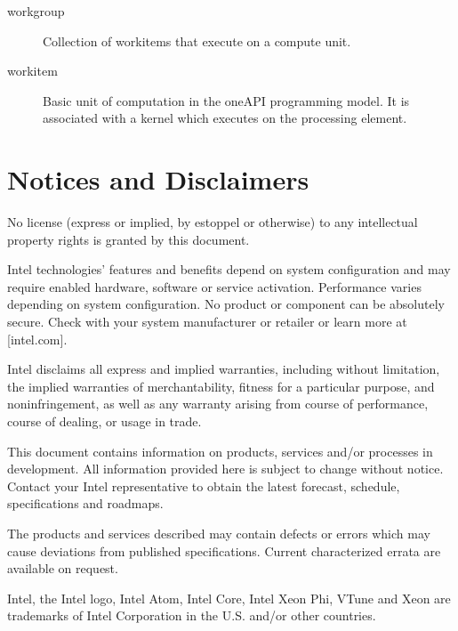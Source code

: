 \documentclass[letterpaper,10pt,english]{sphinxmanual}
\begin{document}
\begin{description}
\item[{work\sphinxhyphen{}group\label{\detokenize{glossary:term-work-group}}}] \leavevmode
Collection of work\sphinxhyphen{}items that execute on a compute unit.

\item[{work\sphinxhyphen{}item\label{\detokenize{glossary:term-work-item}}}] \leavevmode
Basic unit of computation in the oneAPI programming model. It is
associated with a kernel which executes on the processing element.

\end{description}


\chapter{Notices and Disclaimers}
\label{\detokenize{notices-and-disclaimers:notices-and-disclaimers}}\label{\detokenize{notices-and-disclaimers:id1}}\label{\detokenize{notices-and-disclaimers::doc}}
No license (express or implied, by estoppel or otherwise) to any
intellectual property rights is granted by this document.

Intel technologies’ features and benefits depend on system
configuration and may require enabled hardware, software or service
activation. Performance varies depending on system configuration. No
product or component can be absolutely secure. Check with your system
manufacturer or retailer or learn more at {[}intel.com{]}.

Intel disclaims all express and implied warranties, including without
limitation, the implied warranties of merchantability, fitness for a
particular purpose, and non\sphinxhyphen{}infringement, as well as any warranty
arising from course of performance, course of dealing, or usage in
trade.

This document contains information on products, services and/or
processes in development. All information provided here is subject to
change without notice. Contact your Intel representative to obtain
the latest forecast, schedule, specifications and roadmaps.

The products and services described may contain defects or errors
which may cause deviations from published specifications. Current
characterized errata are available on request.

Intel, the Intel logo, Intel Atom, Intel Core, Intel Xeon Phi, VTune and
Xeon are trademarks of Intel Corporation in the U.S. and/or other
countries.
\end{document}
